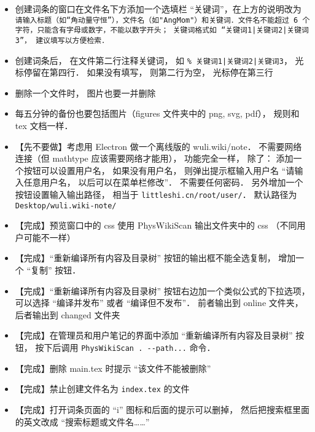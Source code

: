 \begin{itemize}
\item 创建词条的窗口在文件名下方添加一个选填栏 “关键词”，在上方的说明改为 \lstinline+请输入标题（如“角动量守恒”），文件名（如"AngMom"）和关键词．文件名不能超过 6 个字符，只能含有字母或数字，不能以数字开头； 关键词格式如 “关键词1|关键词2|关键词3”， 建议填写以方便检索．+

\item 创建词条后， 在文件第二行注释关键词， 如 \lstinline+% 关键词1|关键词2|关键词3+， 光标停留在第四行． 如果没有填写， 则第二行为空， 光标停在第三行

\item 删除一个文件时， 图片也要一并删除

\item 每五分钟的备份也要包括图片（figures 文件夹中的 png, svg, pdf）， 规则和 tex 文档一样．

\item 【先不要做】考虑用 Electron 做一个离线版的 wuli.wiki/note． 不需要网络连接（但 mathtype 应该需要网络才能用）， 功能完全一样， 除了： 添加一个按钮可以设置用户名， 如果没有用户名， 则弹出提示框输入用户名 “请输入任意用户名， 以后可以在菜单栏修改”． 不需要任何密码． 另外增加一个按钮设置输入输出路径， 相当于 \verb|littleshi.cn/root/user/|． 默认路径为 \verb|Desktop/wuli.wiki-note/|

\item 【完成】预览窗口中的 css 使用 PhysWikiScan 输出文件夹中的 css （不同用户可能不一样）

\item 【完成】“重新编译所有内容及目录树” 按钮的输出框不能全选复制， 增加一个 “复制” 按钮．

\item 【完成】“重新编译所有内容及目录树” 按钮右边加一个类似公式的下拉选项， 可以选择 “编译并发布” 或者 “编译但不发布”． 前者输出到 online 文件夹， 后者输出到 changed 文件夹

\item 【完成】在管理员和用户笔记的界面中添加 “重新编译所有内容及目录树” 按钮， 按下后调用 \lstinline|PhysWikiScan . --path...|  命令．

\item 【完成】删除 main.tex 时提示 “该文件不能被删除”

\item 【完成】禁止创建文件名为 \lstinline|index.tex| 的文件

\item 【完成】打开词条页面的 “i” 图标和后面的提示可以删掉， 然后把搜索框里面的英文改成 “搜索标题或文件名……”


\end{itemize}
